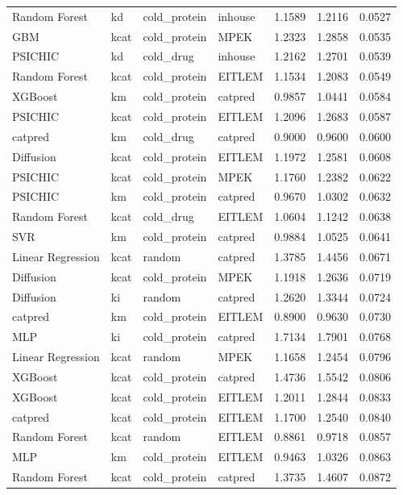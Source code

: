 \begin{tabular}{llllrrr}
Random Forest & kd & cold_protein & inhouse & 1.1589 & 1.2116 & 0.0527 \\
GBM & kcat & cold_protein & MPEK & 1.2323 & 1.2858 & 0.0535 \\
PSICHIC & kd & cold_drug & inhouse & 1.2162 & 1.2701 & 0.0539 \\
Random Forest & kcat & cold_protein & EITLEM & 1.1534 & 1.2083 & 0.0549 \\
XGBoost & km & cold_protein & catpred & 0.9857 & 1.0441 & 0.0584 \\
PSICHIC & kcat & cold_protein & EITLEM & 1.2096 & 1.2683 & 0.0587 \\
catpred & km & cold_drug & catpred & 0.9000 & 0.9600 & 0.0600 \\
Diffusion & kcat & cold_protein & EITLEM & 1.1972 & 1.2581 & 0.0608 \\
PSICHIC & kcat & cold_protein & MPEK & 1.1760 & 1.2382 & 0.0622 \\
PSICHIC & km & cold_protein & catpred & 0.9670 & 1.0302 & 0.0632 \\
Random Forest & kcat & cold_drug & EITLEM & 1.0604 & 1.1242 & 0.0638 \\
SVR & km & cold_protein & catpred & 0.9884 & 1.0525 & 0.0641 \\
Linear Regression & kcat & random & catpred & 1.3785 & 1.4456 & 0.0671 \\
Diffusion & kcat & cold_protein & MPEK & 1.1918 & 1.2636 & 0.0719 \\
Diffusion & ki & random & catpred & 1.2620 & 1.3344 & 0.0724 \\
catpred & km & cold_protein & EITLEM & 0.8900 & 0.9630 & 0.0730 \\
MLP & ki & cold_protein & catpred & 1.7134 & 1.7901 & 0.0768 \\
Linear Regression & kcat & random & MPEK & 1.1658 & 1.2454 & 0.0796 \\
XGBoost & kcat & cold_protein & catpred & 1.4736 & 1.5542 & 0.0806 \\
XGBoost & kcat & cold_protein & EITLEM & 1.2011 & 1.2844 & 0.0833 \\
catpred & kcat & cold_protein & EITLEM & 1.1700 & 1.2540 & 0.0840 \\
Random Forest & kcat & random & EITLEM & 0.8861 & 0.9718 & 0.0857 \\
MLP & km & cold_protein & EITLEM & 0.9463 & 1.0326 & 0.0863 \\
Random Forest & kcat & cold_protein & catpred & 1.3735 & 1.4607 & 0.0872 \\

\end{tabular}
